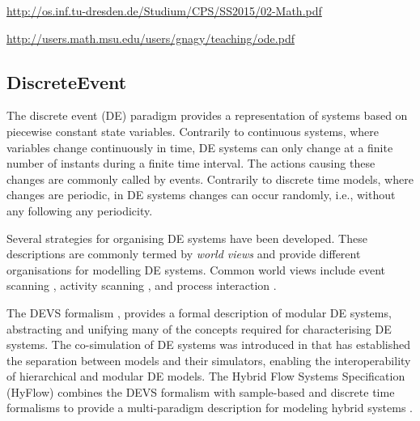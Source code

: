 	
\url{http://os.inf.tu-dresden.de/Studium/CPS/SS2015/02-Math.pdf}
	
\url{http://users.math.msu.edu/users/gnagy/teaching/ode.pdf}

\subsection{DiscreteEvent}%
\label{subsecF:DiscreteEvent}


The discrete event (DE) paradigm provides a representation of systems based on piecewise constant state variables. Contrarily to continuous systems, where variables change continuously in time, DE systems can only change at a finite number of instants during a finite time interval. The actions causing these changes are commonly called by events. Contrarily to discrete time models, where changes are periodic, in DE systems changes can occur randomly, i.e., without any following any periodicity.

Several strategies for organising DE systems have been developed. These descriptions are commonly termed by {\em world views} and  provide different organisations for modelling DE systems. Common world views include event scanning \cite{Kiviat:1968:SIMSCRIPT}, activity scanning \cite{Buxton:1962:CSL}, and process interaction \cite{Dahl:1966:Simula}.

The DEVS formalism \cite{Zeigler:1976:TMS}, provides a formal description of modular DE systems, abstracting and unifying many of the concepts required for characterising DE systems. The co-simulation of DE systems was introduced in \cite{Zeigler:1984:Multifaceted} that has established the separation between models and their simulators, enabling the interoperability of hierarchical and modular DE models. The Hybrid Flow Systems Specification (HyFlow) combines the DEVS formalism with sample-based and discrete time formalisms to provide a multi-paradigm description for modeling hybrid systems \cite{Barros:2008:SDS}.


